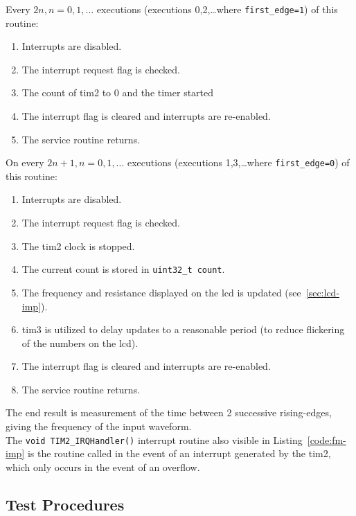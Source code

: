 
Every $2n,
n=0,1,\dots$  executions (executions 0,2,\dots where
\lstinline{first_edge=1}) of this routine:

\begin{enumerate}
	\item Interrupts are disabled.
	\item The interrupt request flag is checked.
	\item The count of \gls{tim2} to 0 and the timer started
	\item The interrupt flag is cleared and interrupts are re-enabled.
	\item The service routine returns.
\end{enumerate}

On every $2n+1, n=0,1,\dots$ executions (executions 1,3,\dots where
\lstinline{first_edge=0}) of this routine:

\begin{enumerate}
	\item Interrupts are disabled.
	\item The interrupt request flag is checked.
	\item The \gls{tim2} clock is stopped.
	\item The current count is stored in \lstinline{uint32_t count}.
	\item The frequency and resistance displayed on the \gls{lcd} is
		updated (see~\ref{sec:lcd-imp}).
	\item \gls{tim3} is utilized to delay updates to a reasonable period
		(to reduce flickering of the numbers on the \gls{lcd}).
	\item The interrupt flag is cleared and interrupts are re-enabled.
	\item The service routine returns.
\end{enumerate}

The end result is measurement of the time between 2 successive
rising-edges, giving the frequency of the input waveform. \\ 

The \lstinline{void TIM2_IRQHandler()} interrupt routine also visible in
Listing~\ref{code:fm-imp} is the routine called in the event of an
interrupt generated by the \gls{tim2}, which only occurs in the event of
an overflow.


\subsection{Test Procedures}
